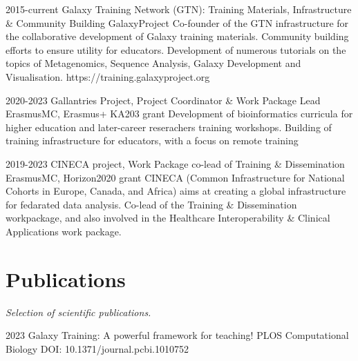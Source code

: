 \documentclass[]{shiltemann-cv}
\begin{document}
\begin{entrylist}
    \entry
    {2015-current}
    {Galaxy Training Network (GTN): Training Materials, Infrastructure \& Community Building}
    {GalaxyProject}
    {Co-founder of the GTN infrastructure for the collaborative development of Galaxy training materials. Community building efforts to ensure utility for educators.  Development of numerous tutorials on the topics of Metagenomics, Sequence Analysis, Galaxy Development and Visualisation. https://training.galaxyproject.org }

\end{entrylist}

\begin{entrylist}

   \entry
    {2020-2023}
    {Gallantries Project, Project Coordinator \& Work Package Lead}
    {ErasmusMC, Erasmus+ KA203 grant}
    {Development of bioinformatics curricula for higher education and later-career reserachers training workshops. Building of training infrastructure for educators, with a focus on remote training}

\end{entrylist}
\begin{entrylist}

   \entry
    {2019-2023}
    {CINECA project, Work Package co-lead of Training \& Dissemination}
    {ErasmusMC, Horizon2020 grant}
    {CINECA (Common Infrastructure for National Cohorts in Europe, Canada, and Africa) aims at creating a global infrastructure for fedarated data analysis. Co-lead of the Training \& Dissemination  workpackage, and also involved in the Healthcare Interoperability \& Clinical Applications work package.}
 \end{entrylist}



\section{Publications}
\emph{Selection of scientific publications.}

\begin{entrylist}
\entry
  {2023}
  {Galaxy Training: A powerful framework for teaching!}
  {PLOS Computational Biology}
  {DOI: 10.1371/journal.pcbi.1010752 }

\end{entrylist}
\end{document}
